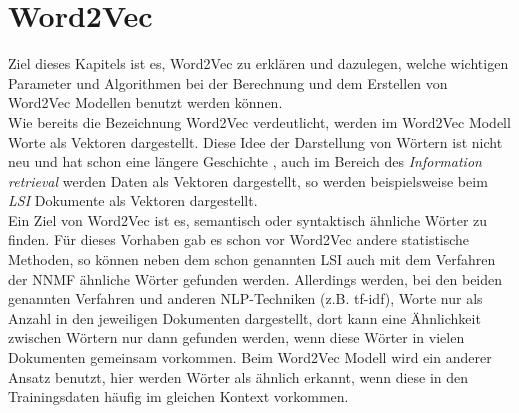 \documentclass[12pt,a4paper]{report}
\begin{document}
\chapter{Word2Vec}
Ziel dieses Kapitels ist es, Word2Vec zu erklären und dazulegen, welche wichtigen Parameter und Algorithmen bei der Berechnung und dem Erstellen von Word2Vec Modellen benutzt werden können.\\
Wie bereits die Bezeichnung Word2Vec verdeutlicht, werden im Word2Vec Modell Worte als Vektoren dargestellt. Diese Idee der Darstellung von Wörtern ist nicht neu und hat schon eine längere Geschichte \cite{Hinton86}, auch im Bereich des \textit{Information retrieval} werden Daten als Vektoren dargestellt, so werden beispielsweise beim \textit{LSI} \cite{deerwester1990indexing} Dokumente als Vektoren dargestellt. \\
Ein Ziel von Word2Vec ist es, semantisch oder syntaktisch ähnliche Wörter zu finden. Für dieses Vorhaben gab es schon vor Word2Vec andere statistische Methoden, so können neben dem schon genannten LSI auch mit dem Verfahren der NNMF ähnliche Wörter gefunden werden. Allerdings werden, bei den beiden genannten Verfahren und anderen NLP-Techniken (z.B. tf-idf), Worte nur als Anzahl in den jeweiligen Dokumenten dargestellt, dort kann eine Ähnlichkeit zwischen Wörtern nur dann gefunden werden, wenn diese Wörter in vielen Dokumenten gemeinsam vorkommen. Beim Word2Vec Modell wird ein anderer Ansatz benutzt, hier werden Wörter als ähnlich erkannt, wenn diese in den Trainingsdaten häufig im gleichen Kontext vorkommen.\\
\end{document}
